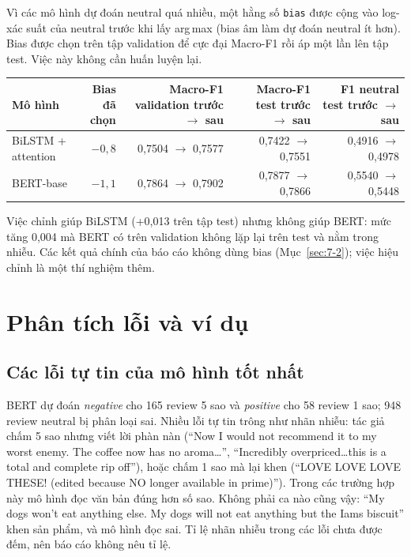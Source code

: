 Vì các mô hình dự đoán neutral quá nhiều, một hằng số \texttt{bias} được cộng vào log-xác suất của neutral trước khi lấy arg\,max (bias âm làm dự đoán neutral ít hơn). Bias được chọn trên tập validation để cực đại Macro-F1 rồi áp một lần lên tập test. Việc này không cần huấn luyện lại.

\begin{center}
\small
\begin{tabular}{@{}lrrrr@{}}
    \toprule
    Mô hình & \shortstack[r]{Bias\\đã chọn} & \shortstack[r]{Macro-F1 validation\\trước $\to$ sau} & \shortstack[r]{Macro-F1 test\\trước $\to$ sau} & \shortstack[r]{F1 neutral test\\trước $\to$ sau} \\
    \midrule
    BiLSTM + attention & $-0{,}8$ & 0,7504 $\to$ 0,7577 & 0,7422 $\to$ 0,7551 & 0,4916 $\to$ 0,4978 \\
    BERT-base & $-1{,}1$ & 0,7864 $\to$ 0,7902 & 0,7877 $\to$ 0,7866 & 0,5540 $\to$ 0,5448 \\
    \bottomrule
\end{tabular}
\end{center}

Việc chỉnh giúp BiLSTM (+0,013 trên tập test) nhưng không giúp BERT: mức tăng 0,004 mà BERT có trên validation không lặp lại trên test và nằm trong nhiễu. Các kết quả chính của báo cáo không dùng bias (Mục~\ref{sec:7-2}); việc hiệu chỉnh là một thí nghiệm thêm.

\section{Phân tích lỗi và ví dụ}
\label{sec:7-8}

\subsection*{Các lỗi tự tin của mô hình tốt nhất}

BERT dự đoán \emph{negative} cho 165 review 5 sao và \emph{positive} cho 58 review 1 sao; 948 review neutral bị phân loại sai. Nhiều lỗi tự tin trông như nhãn nhiễu: tác giả chấm 5 sao nhưng viết lời phàn nàn (``Now I would not recommend it to my worst enemy. The coffee now has no aroma\ldots'', ``Incredibly overpriced\ldots this is a total and complete rip off''), hoặc chấm 1 sao mà lại khen (``LOVE LOVE LOVE THESE! (edited because NO longer available in prime)''). Trong các trường hợp này mô hình đọc văn bản đúng hơn số sao. Không phải ca nào cũng vậy: ``My dogs won't eat anything else. My dogs will not eat anything but the Iams biscuit'' khen sản phẩm, và mô hình đọc sai. Tỉ lệ nhãn nhiễu trong các lỗi chưa được đếm, nên báo cáo không nêu tỉ lệ.

